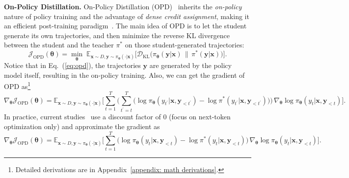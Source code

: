\documentclass{article} %
\begin{document}
\textbf{On-Policy Distillation.} On-Policy Distillation (OPD)~\citep{opd-iclr,minillm,opd-tml} inherits the \textit{on-policy} nature of policy training and the advantage of \textit{dense credit assignment}, making it an efficient post-training paradigm~\citep{qwen3,mimo}. The main idea of OPD is to let the student generate its own trajectories, and then minimize the reverse KL divergence between the student and the teacher $\pi^{*}$ on those student-generated trajectories:
\begin{equation}
\label{eq:opd}
\mathcal{J}_{\text{OPD}}(\boldsymbol{\theta}) =  \min_{\boldsymbol{\theta}}\;
\mathbb{E}_{\boldsymbol{x} \sim D, \boldsymbol{y} \sim \pi_{\boldsymbol{\theta}} (\cdot | \boldsymbol{x}) }\Big[
\mathcal{D}_{\mathrm{KL}} \!\Big(
\pi_{\boldsymbol{\theta}}(\boldsymbol{y} | \boldsymbol{x})
\,\big\|\,
\pi^{*}( \boldsymbol{y} | \boldsymbol{x})
\Big)
\Big].
\end{equation}
Notice that in Eq.~(\ref{eq:opd}), the trajectories $\boldsymbol{y}$ are generated by the policy model itself, resulting in the on-policy training. Also, we can get the gradient of OPD as\footnote{Detailed derivations are in Appendix~\ref{appendix: math derivations}.}
\begin{equation}
\label{eq:opd_gradient_original}
\nabla_{\boldsymbol{\theta}} \mathcal{J}_{\text{OPD}}(\boldsymbol{\theta})=\mathbb{E}_{\boldsymbol{x} \sim D, \boldsymbol{y} \sim \pi_{\boldsymbol{\theta}} (\cdot | \boldsymbol{x}) }\Big[
\sum_{t=1}^{T} \Big( \sum_{t^{'} =t}^{T} \big(\log \pi_{\boldsymbol{\theta}}(y_{t^{'}}| \boldsymbol{x}, \boldsymbol{y}_{<t^{'}} ) - \log \pi^{*}(y_{t^{'}}| \boldsymbol{x}, \boldsymbol{y}_{<t^{'}} ) \big) \Big) \, \nabla_{\boldsymbol{\theta}} \log \pi_{\boldsymbol{\theta}}(y_t| \boldsymbol{x}, \boldsymbol{y}_{<t} ) 
\Big].
\end{equation}
In practice, current studies~\citep{opd-tml,mimo} use a discount factor of 0 (focus on next-token optimization only) and approximate the gradient as
\begin{equation}
\label{eq:opd_gradient}
\nabla_{\boldsymbol{\theta}} \mathcal{J}_{\text{OPD}}(\boldsymbol{\theta}) =  
\mathbb{E}_{\boldsymbol{x} \sim D, \boldsymbol{y} \sim \pi_{\boldsymbol{\theta}} (\cdot | \boldsymbol{x}) }\Big[
\sum_{t=1}^{T} \big(\log \pi_{\boldsymbol{\theta}}(y_t| \boldsymbol{x}, \boldsymbol{y}_{<t} ) - \log \pi^{*}(y_t| \boldsymbol{x}, \boldsymbol{y}_{<t} ) \big) \, \nabla_{\boldsymbol{\theta}} \log \pi_{\boldsymbol{\theta}}(y_t| \boldsymbol{x}, \boldsymbol{y}_{<t} ) 
\Big].
\end{equation}
\end{document}
